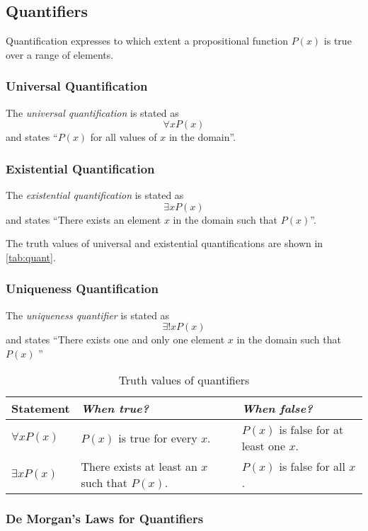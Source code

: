 \subsection{Quantifiers}\label{ssub:quantifiers}
Quantification expresses to which extent a propositional function \(P(x)\) is true over a range of elements.
\subsubsection{Universal Quantification}The \emph{universal quantification} is stated as \[
	\forall x P(x)
\]
and states ``\(P(x)\) for all values of \(x\) in the domain''.
\subsubsection{Existential Quantification}The \emph{existential quantification} is stated as \[
	\exists x P(x)
\]
and states ``There exists an element \(x\) in the domain such that \(P(x)\)''.

The truth values of universal and existential quantifications are shown in \autoref{tab:quant}.

\subsubsection{Uniqueness Quantification}
The \emph{uniqueness quantifier} is stated as \[
	\exists!xP(x)
\]
and states ``There exists one and only one element \( x \) in the domain such that \( P(x) \) ''

\begin{table}[H]
\centering
\caption{Truth values of quantifiers}\label{tab:quant}
\def\arraystretch{2}
\begin{tabular}{p{}p{}p{}}
\toprule
\textbf{Statement}  & \emph{When true?} & \emph{When false?} \\ \midrule
\(\forall x P(x)\) & \(P(x)\) is true for every \(x\). & \(P(x)\) is false for at least one \(x\).\\
\(\exists x P(x)\) & There exists at least an \(x\) such that \(P(x)\). & \(P(x)\) is false for all \(x\). \\ \bottomrule

\end{tabular}
\end{table}
\subsubsection{De Morgan's Laws for Quantifiers}\label{ssub:de_morgan_s_laws_for_quantifiers}

